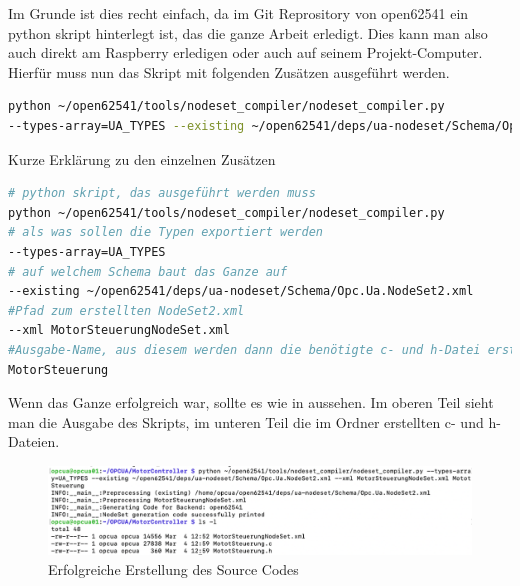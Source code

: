 Im Grunde ist dies recht einfach, da im Git Reprository von open62541 ein python skript hinterlegt ist, das die ganze Arbeit erledigt. Dies kann man also auch direkt am Raspberry erledigen oder auch auf seinem Projekt-Computer.
Hierfür muss nun das Skript mit folgenden Zusätzen ausgeführt werden.
\begin{lstlisting}[language=Bash]
python ~/open62541/tools/nodeset_compiler/nodeset_compiler.py 
--types-array=UA_TYPES --existing ~/open62541/deps/ua-nodeset/Schema/Opc.Ua.NodeSet2.xml --xml MotorSteuerungNodeSet.xml MotorSteuerung
\end{lstlisting}
Kurze Erklärung zu den einzelnen Zusätzen
\begin{lstlisting}[language=Bash]
# python skript, das ausgeführt werden muss
python ~/open62541/tools/nodeset_compiler/nodeset_compiler.py
# als was sollen die Typen exportiert werden
--types-array=UA_TYPES
# auf welchem Schema baut das Ganze auf
--existing ~/open62541/deps/ua-nodeset/Schema/Opc.Ua.NodeSet2.xml
#Pfad zum erstellten NodeSet2.xml
--xml MotorSteuerungNodeSet.xml
#Ausgabe-Name, aus diesem werden dann die benötigte c- und h-Datei erstellt
MotorSteuerung
\end{lstlisting}
Wenn das Ganze erfolgreich war, sollte es wie in  aussehen. Im oberen Teil sieht man die Ausgabe des Skripts, im unteren Teil die im Ordner erstellten c- und h-Dateien.
\begin{figure}[H]
	\centering
	\includegraphics[width=1\linewidth]{abb/ErfolgSource}
	\caption{Erfolgreiche Erstellung des Source Codes}
	\label{fig:erfolgsource}
\end{figure}

